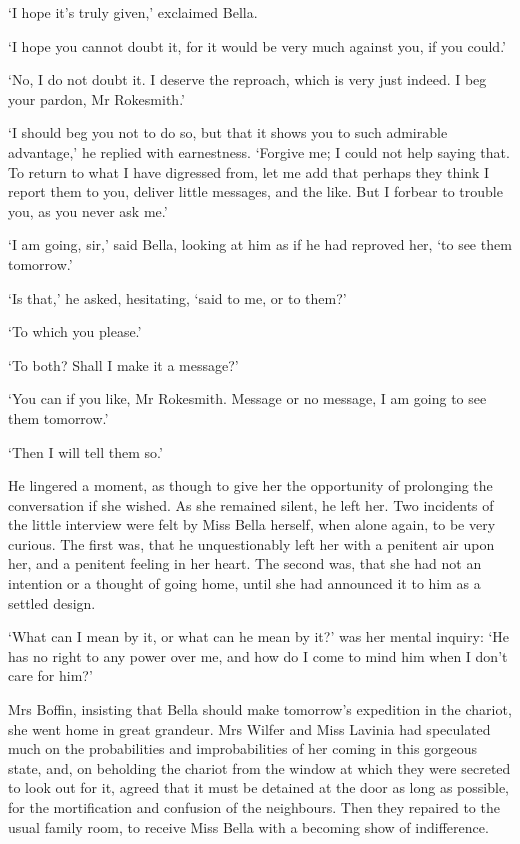 ‘I hope it’s truly given,’ exclaimed Bella.

‘I hope you cannot doubt it, for it would be very much against you, if
you could.’

‘No, I do not doubt it. I deserve the reproach, which is very just
indeed. I beg your pardon, Mr Rokesmith.’

‘I should beg you not to do so, but that it shows you to such admirable
advantage,’ he replied with earnestness. ‘Forgive me; I could not help
saying that. To return to what I have digressed from, let me add that
perhaps they think I report them to you, deliver little messages, and
the like. But I forbear to trouble you, as you never ask me.’

‘I am going, sir,’ said Bella, looking at him as if he had reproved her,
‘to see them tomorrow.’

‘Is that,’ he asked, hesitating, ‘said to me, or to them?’

‘To which you please.’

‘To both? Shall I make it a message?’

‘You can if you like, Mr Rokesmith. Message or no message, I am going to
see them tomorrow.’

‘Then I will tell them so.’

He lingered a moment, as though to give her the opportunity of
prolonging the conversation if she wished. As she remained silent, he
left her. Two incidents of the little interview were felt by Miss Bella
herself, when alone again, to be very curious. The first was, that he
unquestionably left her with a penitent air upon her, and a penitent
feeling in her heart. The second was, that she had not an intention or
a thought of going home, until she had announced it to him as a settled
design.

‘What can I mean by it, or what can he mean by it?’ was her mental
inquiry: ‘He has no right to any power over me, and how do I come to
mind him when I don’t care for him?’

Mrs Boffin, insisting that Bella should make tomorrow’s expedition
in the chariot, she went home in great grandeur. Mrs Wilfer and Miss
Lavinia had speculated much on the probabilities and improbabilities of
her coming in this gorgeous state, and, on beholding the chariot from
the window at which they were secreted to look out for it, agreed
that it must be detained at the door as long as possible, for the
mortification and confusion of the neighbours. Then they repaired to
the usual family room, to receive Miss Bella with a becoming show of
indifference.

